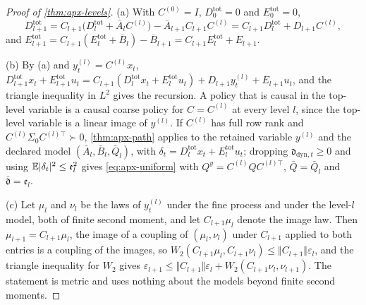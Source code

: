 \begin{proof}[Proof of \cref{thm:apx-levels}]
(a) With $C^{(0)}=I$, $D^{\mathrm{tot}}_0=0$ and $E^{\mathrm{tot}}_0=0$,
\begin{equation*}
D^{\mathrm{tot}}_{l+1}=C_{l+1}\bigl(D^{\mathrm{tot}}_l+\bar A_lC^{(l)}\bigr)-\bar A_{l+1}C_{l+1}C^{(l)}=C_{l+1}D^{\mathrm{tot}}_l+D_{l+1}C^{(l)},
\end{equation*}
and $E^{\mathrm{tot}}_{l+1}=C_{l+1}(E^{\mathrm{tot}}_l+\bar B_l)-\bar B_{l+1}=C_{l+1}E^{\mathrm{tot}}_l+E_{l+1}$.

(b) By (a) and $y^{(l)}_t=C^{(l)}x_t$, $D^{\mathrm{tot}}_{l+1}x_t+E^{\mathrm{tot}}_{l+1}u_t=C_{l+1}(D^{\mathrm{tot}}_lx_t+E^{\mathrm{tot}}_lu_t)+D_{l+1}y^{(l)}_t+E_{l+1}u_t$, and the triangle inequality in $L^2$ gives the recursion. A policy that is causal in the top-level variable is a causal coarse policy for $C=C^{(l)}$ at every level $l$, since the top-level variable is a linear image of $y^{(l)}$. If $C^{(l)}$ has full row rank and $C^{(l)}\Sigma_0C^{(l)\top}\succ0$, \cref{thm:apx-path} applies to the retained variable $y^{(l)}$ and the declared model $(\bar A_l,\bar B_l,\bar Q_l)$, with $\delta_t=D^{\mathrm{tot}}_lx_t+E^{\mathrm{tot}}_lu_t$; dropping $\mathfrak d_{\mathrm{dyn},t}\ge0$ and using $\mathbb{E}\lvert\delta_t\rvert^2\le\mathfrak e_l^2$ gives \cref{eq:apx-uniform} with $Q^y=C^{(l)}QC^{(l)\top}$, $\bar Q=\bar Q_l$ and $\bar{\mathfrak d}=\mathfrak e_l$.

(c) Let $\mu_l$ and $\nu_l$ be the laws of $y^{(l)}_t$ under the fine process and under the level-$l$ model, both of finite second moment, and let $C_{l+1}\mu_l$ denote the image law. Then $\mu_{l+1}=C_{l+1}\mu_l$, the image of a coupling of $(\mu_l,\nu_l)$ under $C_{l+1}$ applied to both entries is a coupling of the images, so $W_2(C_{l+1}\mu_l,C_{l+1}\nu_l)\le\Vert C_{l+1}\Vert\varepsilon_l$, and the triangle inequality for $W_2$ gives $\varepsilon_{l+1}\le\Vert C_{l+1}\Vert\varepsilon_l+W_2(C_{l+1}\nu_l,\nu_{l+1})$. The statement is metric and uses nothing about the models beyond finite second moments.
\end{proof}

